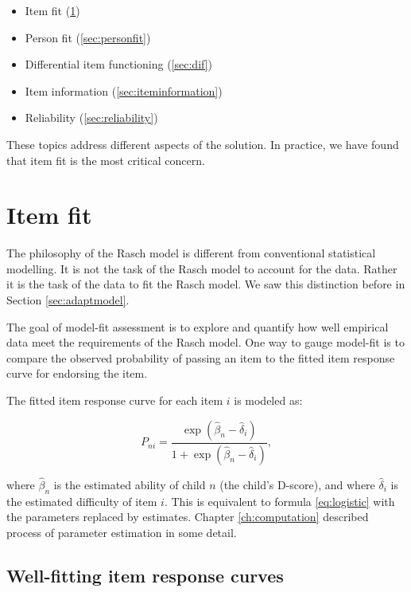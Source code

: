 \documentclass[
]{book}
\providecommand{\tightlist}{%
  \setlength{\itemsep}{0pt}\setlength{\parskip}{0pt}}
\begin{document}
\begin{itemize}
\tightlist
\item
  Item fit (\ref{sec:itemfit})
\item
  Person fit (\ref{sec:personfit})
\item
  Differential item functioning (\ref{sec:dif})
\item
  Item information (\ref{sec:iteminformation})
\item
  Reliability (\ref{sec:reliability})
\end{itemize}

These topics address different aspects of the solution. In practice, we have found that item fit is the most critical concern.

\hypertarget{sec:itemfit}{%
\section{Item fit}\label{sec:itemfit}}

The philosophy of the Rasch model is different from conventional statistical modelling. It is not the task of the Rasch model to account for the data. Rather it is the task of the data to fit the Rasch model. We saw this distinction before in Section \ref{sec:adaptmodel}.

The goal of model-fit assessment is to explore and quantify how well empirical data meet the requirements of the Rasch model. One way to gauge model-fit is to compare the observed probability of passing an item to the fitted item response curve for endorsing the item.

The fitted item response curve for each item \(i\) is modeled as:

\[P_{ni} = \frac{\exp(\hat\beta_{n} - \hat\delta_{i})}{1+\exp(\hat\beta_{n}-\hat\delta_{i})},\]

where \(\hat\beta_n\) is the estimated ability of child \(n\) (the child's D-score), and where \(\hat\delta_i\) is the estimated difficulty of item \(i\). This is equivalent to formula \eqref{eq:logistic} with the parameters replaced by estimates. Chapter \ref{ch:computation} described process of parameter estimation in some detail.

\hypertarget{well-fitting-item-response-curves}{%
\subsection{Well-fitting item response curves}\label{well-fitting-item-response-curves}}
\end{document}
